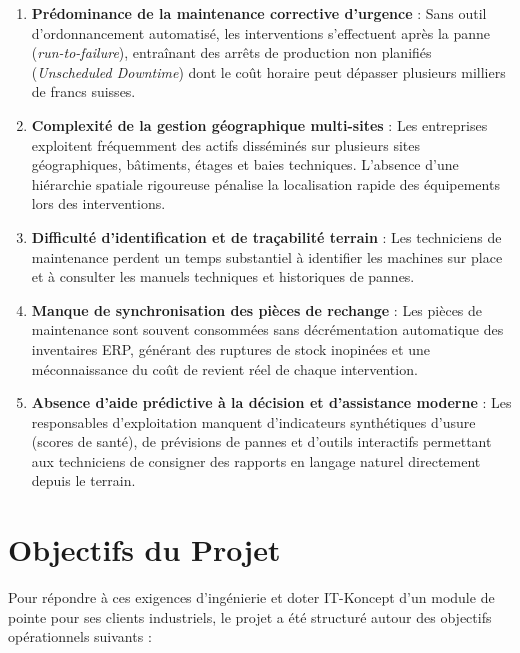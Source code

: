 \begin{enumerate}[leftmargin=1.2cm, label=\textbf{\arabic*.}]
    \item \textbf{Prédominance de la maintenance corrective d'urgence} : Sans outil d'ordonnancement automatisé, les interventions s'effectuent après la panne (\textit{run-to-failure}), entraînant des arrêts de production non planifiés (\textit{Unscheduled Downtime}) dont le coût horaire peut dépasser plusieurs milliers de francs suisses.
    \item \textbf{Complexité de la gestion géographique multi-sites} : Les entreprises exploitent fréquemment des actifs disséminés sur plusieurs sites géographiques, bâtiments, étages et baies techniques. L'absence d'une hiérarchie spatiale rigoureuse pénalise la localisation rapide des équipements lors des interventions.
    \item \textbf{Difficulté d'identification et de traçabilité terrain} : Les techniciens de maintenance perdent un temps substantiel à identifier les machines sur place et à consulter les manuels techniques et historiques de pannes.
    \item \textbf{Manque de synchronisation des pièces de rechange} : Les pièces de maintenance sont souvent consommées sans décrémentation automatique des inventaires ERP, générant des ruptures de stock inopinées et une méconnaissance du coût de revient réel de chaque intervention.
    \item \textbf{Absence d'aide prédictive à la décision et d'assistance moderne} : Les responsables d'exploitation manquent d'indicateurs synthétiques d'usure (scores de santé), de prévisions de pannes et d'outils interactifs permettant aux techniciens de consigner des rapports en langage naturel directement depuis le terrain.
\end{enumerate}

\section{Objectifs du Projet}
Pour répondre à ces exigences d'ingénierie et doter IT-Koncept d'un module de pointe pour ses clients industriels, le projet a été structuré autour des objectifs opérationnels suivants :

